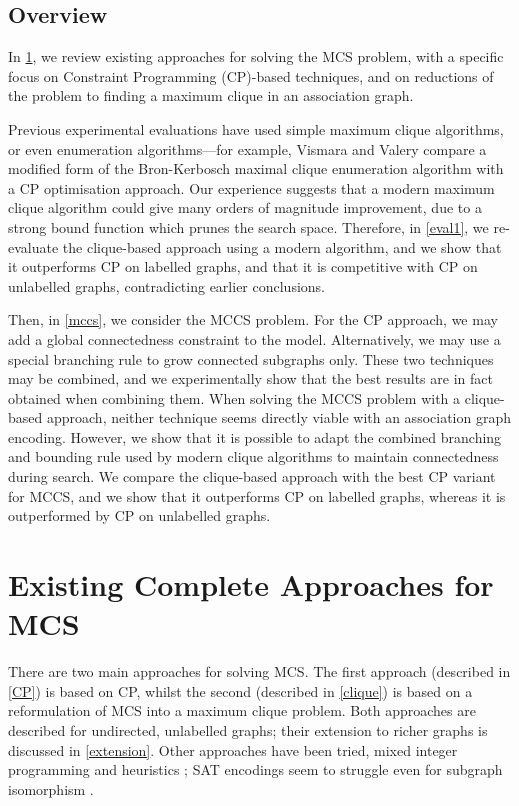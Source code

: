 \documentclass{llncs}
\begin{document}
\subsection{Overview}

In \cref{existing}, we review existing approaches for solving the MCS problem, with a specific focus
on Constraint Programming (CP)-based techniques, and on reductions of the problem to finding a
maximum clique in an association graph.

Previous experimental evaluations have used simple maximum clique algorithms, or even enumeration
algorithms---for example, Vismara and Valery \cite{DBLP:conf/mco/VismaraV08} compare a modified form
of the Bron-Kerbosch maximal clique enumeration algorithm \cite{Bron:1973:AFC:362342.362367} with a
CP optimisation approach. Our experience suggests that a modern maximum clique algorithm could give
many orders of magnitude improvement, due to a strong bound function which prunes the search space.
Therefore, in \cref{eval1}, we re-evaluate the clique-based approach using a modern algorithm, and
we show that it outperforms CP on labelled graphs, and that it is competitive with CP on unlabelled
graphs, contradicting earlier conclusions.

Then, in \cref{mccs}, we consider the MCCS problem. For the CP approach, we may add a global
connectedness constraint to the model. Alternatively, we may use a special branching rule
\cite{DBLP:conf/mco/VismaraV08} to grow connected subgraphs only. These two techniques may be
combined, and we experimentally show that the best results are in fact obtained when combining them.
When solving the MCCS problem with a clique-based approach, neither technique seems directly viable
with an association graph encoding.  However, we show that it is possible to adapt the combined
branching and bounding rule used by modern clique algorithms to maintain connectedness during
search.  We compare the clique-based approach with the best CP variant for MCCS, and we show that it
outperforms CP on labelled graphs, whereas it is outperformed by CP on unlabelled graphs.

\section{Existing Complete Approaches for MCS}\label{existing}

There are two main approaches for solving MCS. The first approach (described in \cref{CP}) is based
on CP, whilst the second (described in \cref{clique}) is based on a reformulation of MCS into a
maximum clique problem. Both approaches are described for undirected, unlabelled graphs; their
extension to richer graphs is discussed in \cref{extension}.  Other approaches have been tried,
mixed integer programming \cite{DBLP:journals/anor/PivaS12} and heuristics
\cite{DBLP:journals/jcisd/EnglertK15}; SAT encodings seem to struggle even for subgraph isomorphism
\cite{UpcomingIJCAIPaper}.
\end{document}

